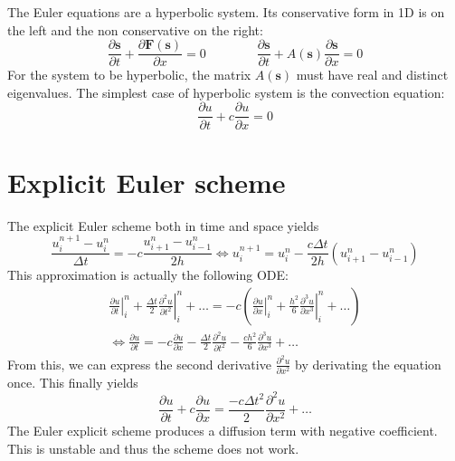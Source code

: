 \documentclass[12pt, openany]{report}
\theoremstyle{definition}
\begin{document}
The Euler equations are a hyperbolic system. Its conservative form in 1D is on the left and the non conservative on the right:
\begin{equation}\label{eq:hyperbolic}
	\frac{\partial \boldsymbol{s}}{\partial t} + \frac{\partial \boldsymbol{F}(\boldsymbol{s})}{\partial x} = 0 \qquad \qquad \frac{\partial \boldsymbol{s}}{\partial t} + A(\boldsymbol{s})\frac{\partial \boldsymbol{s}}{\partial x}=0
\end{equation}
For the system to be hyperbolic, the matrix $A(\boldsymbol{s})$ must have real and distinct eigenvalues. The simplest case of hyperbolic system is the convection equation: 
\begin{equation}
	\frac{\partial u}{\partial t} + c\frac{\partial u }{\partial x}=0
\end{equation}
\section{Explicit Euler scheme}
The explicit Euler scheme both in time and space yields
\begin{equation}
	\frac{u_i^{n+1}-u_i^n}{\Delta t} = -c\frac{u_{i+1}^n-u_{i-1}^n}{2h} \Longleftrightarrow u_i^{n+1} = u_i^n - \frac{c\Delta t}{2h}\left(u_{i+1}^n-u_{i-1}^n\right)
\end{equation}
This approximation is actually the following ODE:
\begin{equation}
	\begin{aligned}	
		\left.\frac{\partial u}{\partial t}\right|_i^n + \frac{\Delta t}{2}\left.\frac{\partial^2u}{\partial t^2}\right|_i ^n + \dots = -c \left(\left.\frac{\partial u}{\partial x}\right|_i^n + \frac{h^2}{6}\left.\frac{\partial^3 u}{\partial x^3}\right|_i^n+\dots\right)\\
		\Longleftrightarrow \frac{\partial u}{\partial t} = -c \frac{\partial u}{\partial x} - \frac{\Delta t}{2}\frac{\partial^2u}{\partial t^2} - \frac{ch^2}{6} \frac{\partial^3 u}{\partial x^3} + \dots 
	\end{aligned}
\end{equation}
From this, we can express the second derivative $\frac{\partial^2u}{\partial x^2}$ by derivating the equation once. This finally yields 
\begin{equation}
	\frac{\partial u}{\partial t}+ c\frac{\partial u}{\partial x} = \frac{-c\Delta t^2}{2} \frac{\partial^2 u}{\partial x^2} + \dots 
\end{equation}
The Euler explicit scheme produces a diffusion term with negative coefficient. This is unstable and thus the scheme does not work. 
\end{document}
